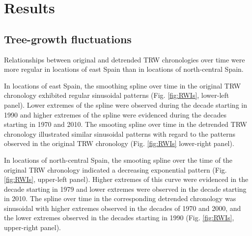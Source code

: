 \documentclass[review,authoryear]{elsarticle}
\begin{document}

\section{Results}

\subsection{Tree-growth fluctuations}
Relationships between original and detrended \gls{TRW} chronologies
over time were more regular in locations of east Spain than in
locations of north-central Spain.

In locations of east Spain, the smoothing spline over time in the
original \gls{TRW} chronology exhibited regular sinusoidal patterns
(Fig. \ref{fig:RWIs}, lower-left panel). Lower extremes of the spline
were observed during the decade starting in 1990 and higher extremes
of the spline were evidenced during the decades starting in 1970 and
2010. The smooting spline over time in the detrended \gls{TRW}
chronology illustrated similar sinusoidal patterns with regard to the
patterns observed in the original \gls{TRW} chronology
(Fig. \ref{fig:RWIs} lower-right panel).

In locations of north-central Spain, the smooting spline over the time
of the original \gls{TRW} chronology indicated a decreasing
exponential pattern (Fig. \ref{fig:RWIs}, upper-left panel). Higher
extremes of this curve were evidenced in the decade starting in 1979
and lower extremes were observed in the decade starting in 2010. The
spline over time in the corresponding detrended chronology was
sinusoidal with higher extremes observed in the decades of 1970 and
2000, and the lower extremes observed in the decades starting in 1990
(Fig. \ref{fig:RWIs}, upper-right panel).
\end{document}
